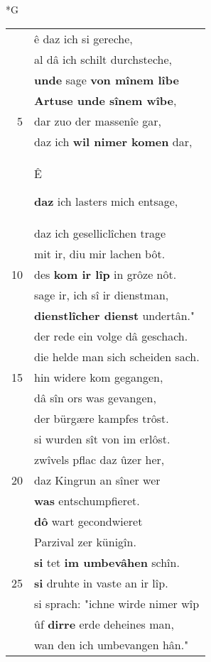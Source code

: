 \documentclass[8pt,a4paper,notitlepage]{article}
\begin{document}
\newpage
\begin{table}[ht]
\begin{minipage}[t]{0.5\linewidth}
\small
\begin{center}*G
\end{center}
\begin{tabular}{rl}
 & ê daz ich si gereche,\\ 
 & al dâ ich schilt durchsteche,\\ 
 & \textbf{unde} sage \textbf{von mînem lîbe}\\ 
 & \textbf{Artuse unde sînem wîbe},\\ 
5 & dar zuo der massenîe gar,\\ 
 & daz ich \textbf{wil nimer komen} dar,\\ 
 & \begin{large}Ê\end{large} \textbf{daz} ich lasters mich entsage,\\ 
 & daz ich geselliclîchen trage\\ 
 & mit ir, diu mir lachen bôt.\\ 
10 & des \textbf{kom ir lîp} in grôze nôt.\\ 
 & sage ir, ich sî ir dienstman,\\ 
 & \textbf{dienstlîcher dienst} undertân."\\ 
 & der rede ein volge dâ geschach.\\ 
 & die helde man sich scheiden sach.\\ 
15 & hin widere kom gegangen,\\ 
 & dâ sîn ors was gevangen,\\ 
 & der bürgære kampfes trôst.\\ 
 & si wurden sît von im erlôst.\\ 
 & zwîvels pflac daz ûzer her,\\ 
20 & daz Kingrun an sîner wer\\ 
 & \textbf{was} entschumpfieret.\\ 
 & \textbf{dô} wart gecondwieret\\ 
 & Parzival zer künigîn.\\ 
 & \textbf{si} tet \textbf{im umbevâhen} schîn.\\ 
25 & \textbf{si} druhte in vaste an ir lîp.\\ 
 & si sprach: "ichne wirde nimer wîp\\ 
 & ûf \textbf{dirre} erde deheines man,\\ 
 & wan den ich umbevangen hân."\\ 

\end{tabular}
\end{minipage}
\end{table}
\end{document}
